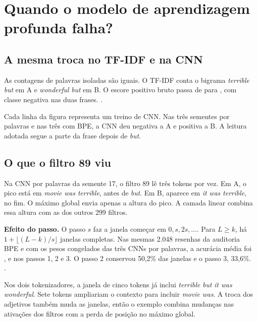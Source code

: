 \section{Quando o modelo de aprendizagem profunda falha?}
\label{sec:falhas}
\subsection{A mesma troca no TF-IDF e na CNN}
\FrasesContraste

As contagens de palavras isoladas são iguais. O TF-IDF conta o bigrama
\textit{terrible but} em A e \textit{wonderful but} em B. O escore positivo
bruto passa de \TfidfContrasteA{} para \TfidfContrasteB{}, com classe negativa
nas duas frases.
.

Cada linha da figura representa um treino de CNN. Nas três sementes por
palavras e nas três com BPE, a CNN deu negativa a A e positiva a B. A
leitura adotada segue a parte da frase depois de \textit{but}.



\subsection{O que o filtro 89 viu}
Na CNN por palavras da semente 17, o filtro 89 lê três tokens por vez.
Em A, o pico está em \textit{movie was terrible}, antes de \textit{but}.
Em B, aparece em \textit{it was terrible}, no fim. O máximo global envia
apenas a altura do pico. A camada linear combina essa altura com
as dos outros 299 filtros.



\textbf{Efeito do passo.} O passo \(s\) faz a janela começar em
\(0,s,2s,\ldots\). Para \(L\ge k\), há \(1+\lfloor(L-k)/s\rfloor\) janelas
completas. Nas mesmas 2.048 resenhas da auditoria BPE e com os pesos
congelados das três CNNs por palavras, a acurácia média foi
\PassoUm{}, \PassoDois{} e \PassoTres{} nos passos 1, 2 e 3. O passo 2
conservou 50,2\% das janelas e o passo 3, 33,6\%.
.

Nos dois tokenizadores, a janela de cinco tokens já inclui
\textit{terrible but it was wonderful}. Sete tokens ampliariam o contexto
para incluir \textit{movie was}. A troca dos adjetivos também muda as
janelas, então o exemplo combina mudanças nas ativações dos filtros
com a perda de posição no máximo global.

